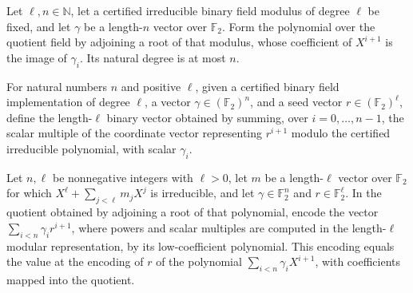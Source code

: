 \begin{theorem}
\label{FABL.executableSmallBiasPolynomial_natDegree_le}
\leanok
{}
Let $\ell,n\in\mathbb{N}$, let a certified irreducible binary field modulus of degree
$\ell$ be fixed, and let $\gamma$ be a length-$n$ vector over $\mathbb{F}_2$. Form the
polynomial over the quotient field by adjoining a root of that modulus, whose
coefficient of $X^{i+1}$ is the image of $\gamma_i$. Its natural degree is at most $n$.
\end{theorem}

\begin{definition}
\label{FABL.executableSmallBiasPowerSum}
\leanok
{}
For natural numbers $n$ and positive $\ell$, given a certified binary field
implementation of degree $\ell$, a vector $\gamma\in(\mathbb{F}_2)^n$, and a seed vector
$r\in(\mathbb{F}_2)^\ell$, define the length-$\ell$ binary vector obtained by summing,
over $i=0,\ldots,n-1$, the scalar multiple of the coordinate vector representing
$r^{i+1}$ modulo the certified irreducible polynomial, with scalar $\gamma_i$.
\end{definition}

\begin{theorem}
\label{FABL.binaryAdjoinRootEncode_executableSmallBiasPowerSum}
\leanok
{}
Let $n,\ell$ be nonnegative integers with $\ell>0$, let $m$ be a length-$\ell$ vector
over $\mathbb F_2$ for which $X^\ell+\sum_{j<\ell}m_jX^j$ is irreducible, and let
$\gamma\in\mathbb F_2^n$ and $r\in\mathbb F_2^\ell$. In the quotient obtained by
adjoining a root of that polynomial, encode the vector $\sum_{i<n}\gamma_i r^{i+1}$,
where powers and scalar multiples are computed in the length-$\ell$ modular
representation, by its low-coefficient polynomial. This encoding equals the value at the
encoding of $r$ of the polynomial $\sum_{i<n}\gamma_i X^{i+1}$, with coefficients mapped
into the quotient.
\end{theorem}

